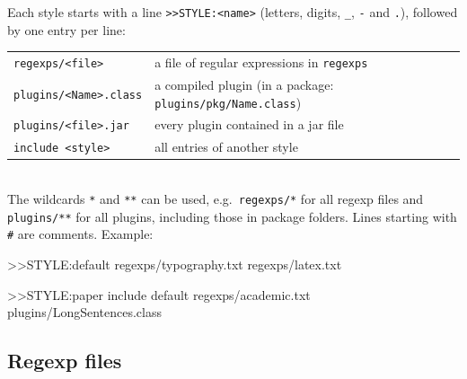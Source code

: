 \documentclass[11pt]{article}
\newcommand{\file}[1]{\texttt{#1}}
\begin{document}
    Each style starts with a line \verb+>>STYLE:<name>+ (letters, digits, \verb+_+, \verb+-+ and \verb+.+), followed by one entry per line:\\[2mm]
    \hspace*{1cm}\begin{tabular}{ll}
        \verb+regexps/<file>+ & a file of regular expressions in \file{regexps}\\
        \verb+plugins/<Name>.class+ & a compiled plugin (in a package: \verb+plugins/pkg/Name.class+)\\
        \verb+plugins/<file>.jar+ & every plugin contained in a jar file\\
        \verb+include <style>+ & all entries of another style
    \end{tabular}\\[2mm]
    The wildcards \verb+*+ and \verb+**+ can be used, e.g.\ \verb+regexps/*+ for all regexp files and \verb+plugins/**+ for all plugins, including those in package folders. Lines starting with \verb+#+ are comments. Example:
    \begin{Code}
>>STYLE:default
regexps/typography.txt
regexps/latex.txt

>>STYLE:paper
include default
regexps/academic.txt
plugins/LongSentences.class
    \end{Code}

    \subsection{Regexp files}
\end{document}
